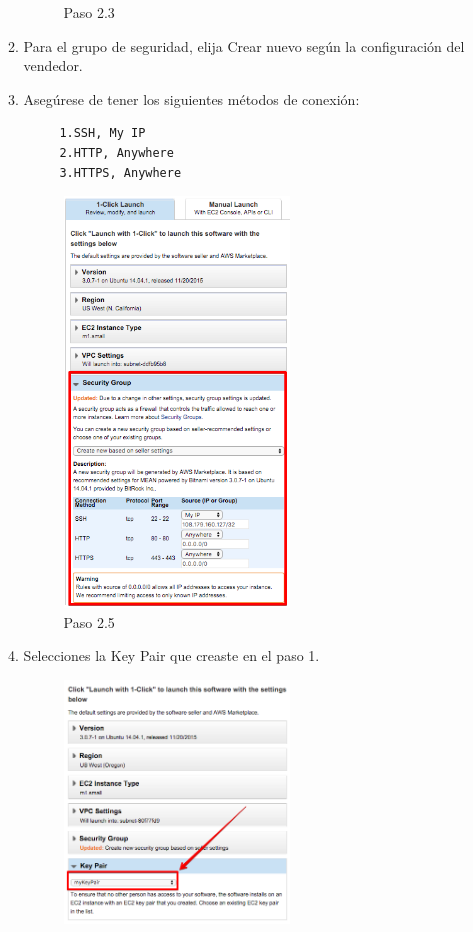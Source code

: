 \begin{itemize}
\begin{enumerate}
\begin{figure}[H]
    \caption{Paso 2.3}
    \end{figure}
    \item Para el grupo de seguridad, elija Crear nuevo según la configuración del vendedor.
    \item Asegúrese de tener los siguientes métodos de conexión:
    \begin{lstlisting}
     1.SSH, My IP
     2.HTTP, Anywhere
     3.HTTPS, Anywhere
    \end{lstlisting}
    \begin{figure}[H]
    \centering
    \includegraphics[width=60mm]{memoria/LaTeX/img/despliegue/paso2_5.png}
    \caption{Paso 2.5}
    \end{figure}
    \item Selecciones la Key Pair que creaste en el paso 1.
    \begin{figure}[H]
    \centering
    \includegraphics[width=60mm]{memoria/LaTeX/img/despliegue/paso2_6.png}

\end{figure}
\end{enumerate}
\end{itemize}
